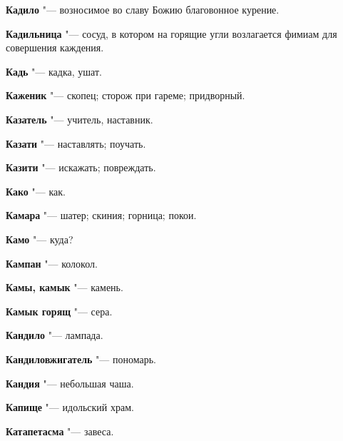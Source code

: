 \begin{mymulticols}{2}
\bukvaending






\noindent\textbf{Кадило} "--- возносимое во славу Божию благовонное курение. 




\noindent\textbf{Кадильница} "--- сосуд, в котором на горящие угли возлагается фимиам для совершения каждения. 




\noindent\textbf{Кадь} "--- кадка, ушат. 




\noindent\textbf{Каженик} "--- скопец; сторож при гареме; придворный. 




\noindent\textbf{Казатель} "--- учитель, наставник. 




\noindent\textbf{Казати} "--- наставлять; поучать. 




\noindent\textbf{Казити} "--- искажать; повреждать. 




\noindent\textbf{Како} "--- как. 




\noindent\textbf{Камара} "--- шатер; скиния; горница; покои. 




\noindent\textbf{Камо} "--- куда? 




\noindent\textbf{Кампан} "--- колокол. 




\noindent\textbf{Камы, камык} "--- камень. 




\noindent\textbf{Камык горящ} "--- сера. 




\noindent\textbf{Кандило} "--- лампада. 




\noindent\textbf{Кандиловжигатель} "--- пономарь. 




\noindent\textbf{Кандия} "--- небольшая чаша. 




\noindent\textbf{Капище} "--- идольский храм. 




\noindent\textbf{Катапетасма} "--- завеса. 





\end{mymulticols}

